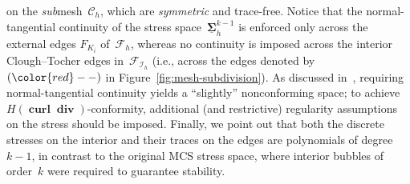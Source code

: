 \documentclass[a4paper,twoside,10pt]{article}
\theoremstyle{plain}
\theoremstyle{remark}
\theoremstyle{definition}
\numberwithin{equation}{section}
\numberwithin{figure}{section}
\newcommand{\Ccalh}{\mathcal{C}_h}
\newcommand{\K}{K}
\newcommand{\F}{F}
\newcommand{\Sigmah}{\underline{\boldsymbol{\Sigma}}_h}
\newcommand{\Sigmahkmo}{\Sigmah^{k-1}}
\DeclareMathOperator{\divebf}{\mathbf{div}}
\DeclareMathOperator{\curlbf}{\mathbf{curl}}
\newcommand{\Fcalhd}{\mathcal{F}_{\mathcal{I}_h}}
\newcommand{\Fcalh}{\mathcal{F}_h}
\newcommand{\Ki}{{\K_i}}
\newcommand{\Fi}{{\F_{\Ki}}}
\begin{document}
on the \emph{sub}mesh~$\Ccalh$,
which are \emph{symmetric} and trace-free.
Notice that the normal-tangential continuity of the stress space~$\Sigmahkmo$
is enforced only across the external edges $\Fi$ of~$\Fcalh$,
whereas no continuity is imposed across
the interior Clough--Tocher edges in~$\Fcalhd$
(i.e., across the edges denoted by $({\color{red}- -})$ in Figure~\ref{fig:mesh-subdivision}).
As discussed in~\cite[Sect.~4]{Gopalakrishnan-Lederer-Schoberl:2020},
requiring normal-tangential continuity
yields a ``slightly'' nonconforming space;
to achieve $H(\curlbf\divebf)$-conformity,
additional (and restrictive)
regularity assumptions on the stress should be imposed.
Finally,
we point out that both the discrete stresses on the interior
and their traces on the edges
are polynomials of degree $k-1$,
in contrast to the original MCS stress space,
where interior bubbles of order~$k$ were required
to guarantee stability.
\end{document}
